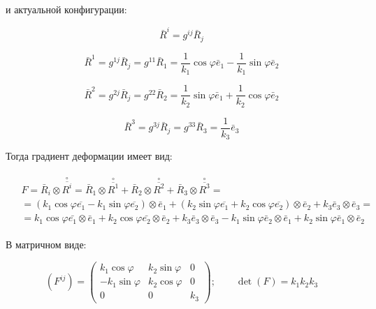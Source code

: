 \documentclass[14pt,a4paper]{scrartcl}
\begin{document}
и актуальной конфигурации:


\begin{equation*}
	\bar{R}^{i}=g^{i j} \bar{R}_{j}
\end{equation*}


\begin{equation*}
	\bar{R}^{1}=g^{1 j} \bar{R}_{j}=g^{11} \bar{R}_{1}=\frac{1}{k_{1}} \cos \varphi \bar{e}_{1}-\frac{1}{k_{1}} \sin \varphi \bar{e}_{2}
\end{equation*}


\begin{equation*}
	\bar{R}^{2}=g^{2 j} \bar{R}_{j}=g^{22} \bar{R}_{2}=\frac{1}{k_{2}} \sin \varphi \bar{e}_{1}+\frac{1}{k_{2}} \cos \varphi \bar{e}_{2}
\end{equation*}


\begin{equation*}
	\bar{R}^{3}=g^{3 j} \bar{R}_{j}=g^{33} \bar{R}_{3}=\frac{1}{k_{3}} \bar{e}_{3}
\end{equation*}



Тогда градиент деформации имеет вид:

\begin{align*}
	\begin{aligned}
	&F=\bar{R}_{i} \otimes \overset{\circ}{\overline{R^i}}=\bar{R}_{1} \otimes \overset{\circ}{\overline{R^1}}+\bar{R}_{2} \otimes \overset{\circ}{\overline{R^2}}+\bar{R}_{3} \otimes \overset{\circ}{\overline{R^3}}=\\
	&=\left(k_{1} \cos \varphi \overline{e_{1}}-k_{1} \sin \varphi \overline{e_{2}}\right) \otimes \bar{e}_{1}+\left(k_{2} \sin \varphi \overline{e_{1}}+k_{2} \cos \varphi \overline{e_{2}}\right) \otimes \bar{e}_{2}+k_{3} \bar{e}_{3} \otimes \bar{e}_{3}=\\
	&=k_{1} \cos \varphi\bar{e_{1}} \otimes \bar{e}_{1}+k_{2} \cos \varphi \bar{e_{2}} \otimes \bar{e}_{2}+k_{3} \bar{e}_{3} \otimes \bar{e}_{3}-k_{1} \sin \varphi \bar{e}_{2} \otimes \bar{e}_{1}+k_{2} \sin \varphi \bar{e}_{1} \otimes \bar{e}_{2}
	\end{aligned}
\end{align*}


В матричном виде:

\begin{equation*}
	\left(F^{i j}\right)=\left(\begin{array}{ccc}
	k_{1} \cos \varphi & k_{2} \sin \varphi & 0 \\
	-k_{1} \sin \varphi & k_{2} \cos \varphi & 0 \\
	0 & 0 & k_{3}
	\end{array}\right); \quad \quad \det(F) = k_1k_2k_3
\end{equation*}
\end{document}
